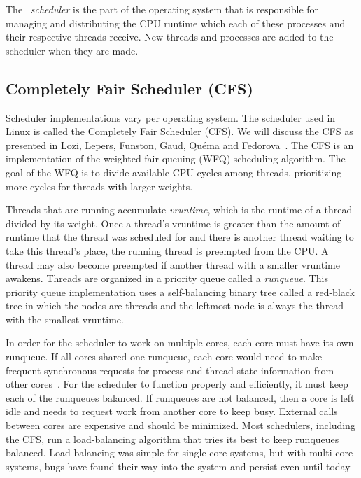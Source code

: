 \documentclass{sig-alternate}
\begin{document}
The ~\emph{scheduler} is the part of the operating system that is responsible for managing and distributing the CPU runtime which each of these processes and their respective threads receive. New threads and processes are added to the scheduler when they are made.~\cite{Lozi:2016}

\subsection{Completely Fair Scheduler (CFS)}
\label{sec:cfs}

Scheduler implementations vary per operating system. The scheduler used in Linux is called the Completely Fair Scheduler (CFS). We will discuss the CFS as presented in Lozi, Lepers, Funston, Gaud, Quéma and Fedorova~\cite{Lozi:2016}. The CFS is an implementation of the weighted fair queuing (WFQ) scheduling algorithm. The goal of the WFQ is to divide available CPU cycles among threads, prioritizing more cycles for threads with larger weights.

Threads that are running accumulate \emph{vruntime}, which is the runtime of a thread divided by its weight. Once a thread's vruntime is greater than the amount of runtime that the thread was scheduled for and there is another thread waiting to take this thread's place, the running thread is preempted from the CPU. A thread may also become preempted if another thread with a smaller vruntime awakens. Threads are organized in a priority queue called a \emph{runqueue}. This priority queue implementation uses a self-balancing binary tree called a red-black tree in which the nodes are threads and the leftmost node is always the thread with the smallest vruntime.~\cite{Lozi:2016}

In order for the scheduler to work on multiple cores, each core must have its own runqueue. If all cores shared one runqueue, each core would need to make frequent synchronous requests for process and thread state information from other cores~\cite{Lozi:2016}. For the scheduler to function properly and efficiently, it must keep each of the runqueues balanced. If runqueues are not balanced, then a core is left idle and needs to request work from another core to keep busy. External calls between cores are expensive and should be minimized. Most schedulers, including the CFS, run a load-balancing algorithm that tries its best to keep runqueues balanced. Load-balancing was simple for single-core systems, but with multi-core systems, bugs have found their way into the system and persist even until today
\end{document}
